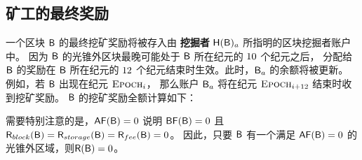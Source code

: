 \subsection{矿工的最终奖励}

一个区块 $\textsf{B}$  的最终挖矿奖励将被存入由 {\bf 挖掘者} $\textsf{H}(\textsf{B})_a$ 所指明的区块挖掘者账户中。
因为 $\textsf{B}$ 的光锥外区块最晚可能处于 $\textsf{B}$ 所在纪元的 ${10}$ 个纪元之后，
分配给 $\textsf{B}$ 的奖励在 $\textsf{B}$ 所在纪元的 $12$ 个纪元结束时生效。此时，$\textsf{B}_a$ 的余额将被更新。
例如，若 $\textsf{B}$ 出现在纪元 $\textsc{Epoch}_i$， 那么账户 $\textsf{B}_a$ 将在纪元 $\textsc{Epoch}_{i+12}$ 结束时收到挖矿奖励。
$\textsf{B}$ 的挖矿奖励全额计算如下：

\newversion{
	\begin{align}
	\reward(\block)\eqdef  \award(\block) + \storageaward(\block) + \feeaward(\block) 
\end{align}
}

需要特别注意的是，$\mathsf{AF}(\textsf{B})=0$ 说明 $\mathsf{BF}(\textsf{B})=0$ 且 $\textsf{R}_{block}(\textsf{B})=\textsf{R}_{storage}(\textsf{B})=\textsf{R}_{fee}(\textsf{B})=0$。
因此，只要 $\textsf{B}$ 有一个满足 $\mathsf{AF}(\textsf{B})=0$ 的光锥外区域，则$\textsf{R}(\textsf{B})=0$。






